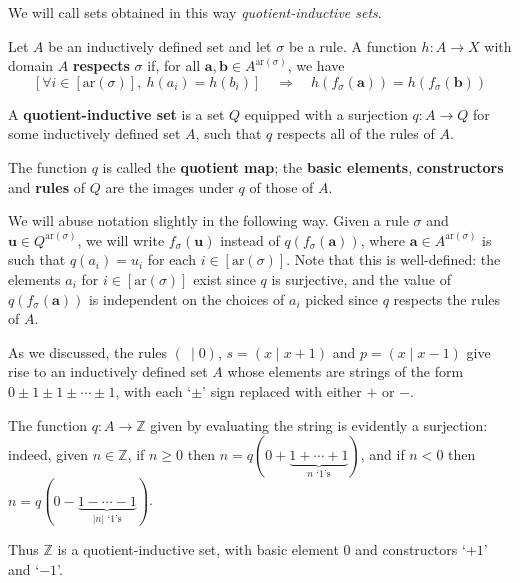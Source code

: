 We will call sets obtained in this way \textit{quotient-inductive sets}.

\begin{definition}
\label{defFunctionRespectsRule}
Let $A$ be an inductively defined set and let $\sigma$ be a rule. A function $h : A \to X$ with domain $A$ \textbf{respects} $\sigma$ if, for all $\mathbf{a},\mathbf{b} \in A^{\mathrm{ar}(\sigma)}$, we have
\[ [\forall i \in [\mathrm{ar}(\sigma)],~ h(a_i) = h(b_i)] \quad \Rightarrow \quad h(f_{\sigma}(\mathbf{a})) = h(f_{\sigma}(\mathbf{b})) \]
\end{definition}


\begin{definition}
\label{defQuotientInductiveSet}
A \textbf{quotient-inductive set} is a set $Q$ equipped with a surjection $q : A \to Q$ for some inductively defined set $A$, such that $q$ respects all of the rules of $A$.

The function $q$ is called the \textbf{quotient map}; the \textbf{basic elements}, \textbf{constructors} and \textbf{rules} of $Q$ are the images under $q$ of those of $A$.
\end{definition}

We will abuse notation slightly in the following way. Given a rule $\sigma$ and $\mathbf{u} \in Q^{\mathrm{ar}(\sigma)}$, we will write $f_{\sigma}(\mathbf{u})$ instead of $q(f_{\sigma}(\mathbf{a}))$, where $\mathbf{a} \in A^{\mathrm{ar}(\sigma)}$ is such that $q(a_i) = u_i$ for each $i \in [\mathrm{ar}(\sigma)]$. Note that this is well-defined: the elements $a_i$ for $i \in [\mathrm{ar}(\sigma)]$ exist since $q$ is surjective, and the value of $q(f_{\sigma}(\mathbf{a}))$ is independent on the choices of $a_i$ picked since $q$ respects the rules of $A$.

\begin{example}
As we discussed, the rules $(~ \mid 0)$, $s = (x \mid x+1)$ and $p = (x \mid x-1)$ give rise to an inductively defined set $A$ whose elements are strings of the form $0 \pm 1 \pm 1 \pm \cdots \pm 1$, with each `$\pm$' sign replaced with either $+$ or $-$.

The function $q : A \to \mathbb{Z}$ given by evaluating the string is evidently a surjection: indeed, given $n \in \mathbb{Z}$, if $n \ge 0$ then $n = q(0+\underbrace{1+\cdots+1}_{\text{$n$ `$1$'s}})$, and if $n < 0$ then $n = q(0-\underbrace{1-\cdots-1}_{\text{$|n|$ `$1$'s}})$.

Thus $\mathbb{Z}$ is a quotient-inductive set, with basic element $0$ and constructors `$+1$' and `$-1$'.
\end{example}

